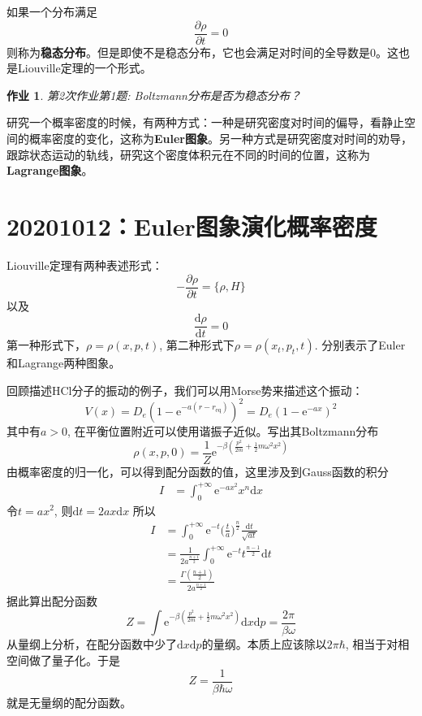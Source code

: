 \documentclass[12pt]{article}
\newtheorem{asg}{作业}
\begin{document}
如果一个分布满足
\begin{equation*}
    \frac {\partial \rho}{\partial t} = 0
\end{equation*}
则称为\textbf{稳态分布}。但是即使不是稳态分布，它也会满足对时间的全导数是0。这也是Liouville定理的一个形式。
\begin{asg}
    第2次作业第1题: Boltzmann分布是否为稳态分布？
\end{asg}

研究一个概率密度的时候，有两种方式：一种是研究密度对时间的偏导，看静止空间的概率密度的变化，这称为\textbf{Euler图象}。另一种方式是研究密度对时间的劝导，跟踪状态运动的轨线，研究这个密度体积元在不同的时间的位置，这称为\textbf{Lagrange图象}。

\section{20201012：Euler图象演化概率密度}

Liouville定理有两种表述形式：
\begin{equation*}
    -\frac {\partial \rho}{\partial t} = \{ \rho,H \}
\end{equation*}
以及 
\begin{equation*}
    \frac {\mathrm{d}\rho}{\mathrm{d}t} = 0
\end{equation*}
第一种形式下，$\rho = \rho(x, p ,t)$, 第二种形式下$\rho = \rho(x_t,p_t,t)$. 分别表示了Euler和Lagrange两种图象。

回顾描述HCl分子的振动的例子，我们可以用Morse势来描述这个振动：
\begin{equation*}
    V(x) = D_e (1- \mathrm{e}^{-a(r-r_\mathrm{eq})})^2 = D_e(1-\mathrm{e}^{-ax})^2
\end{equation*}
其中有$a>0$, 在平衡位置附近可以使用谐振子近似。写出其Boltzmann分布
\begin{equation*}
    \rho(x,p,0) = \frac 1Z \mathrm{e}^{-\beta (\frac {p^2}{2m} + \frac 12 m\omega^2 x^2)} 
\end{equation*}
由概率密度的归一化，可以得到配分函数的值，这里涉及到Gauss函数的积分
\begin{align*}
    I &= \int_0^{+\infty} \mathrm{e}^{-ax^2} x^{n} \mathrm{d}x
\end{align*}
令$t = ax^2$, 则$\mathrm{d}t = 2ax\mathrm{d}x$
所以
\begin{align*}
I &= \int_0^{+\infty} \mathrm{e}^{-t} \bigg(\frac ta\bigg)^{\frac n2} \frac {\mathrm{d}t}{\sqrt{at}}\\
&= \frac 1{2a^{\frac {n+1}2}} \int_0^{+\infty} \mathrm{e}^{-t} t^{\frac {n-1}2} \mathrm{d}t\\
&= \frac {\Gamma(\frac {n+1}2)}{2a^{\frac {n+1}2}}
\end{align*}
据此算出配分函数
\begin{equation*}
    Z = \int \mathrm{e}^{-\beta (\frac {p^2}{2m} + \frac 12 m\omega^2 x^2)} \mathrm{d}x\mathrm{d}p = \frac {2\pi}{\beta \omega}
\end{equation*}
从量纲上分析，在配分函数中少了$\mathrm{d}x\mathrm{d}p$的量纲。本质上应该除以$2\pi\hbar$, 相当于对相空间做了量子化。于是
\begin{equation*}
    Z = \frac 1{\beta \hbar \omega}
\end{equation*}
就是无量纲的配分函数。
\end{document}

